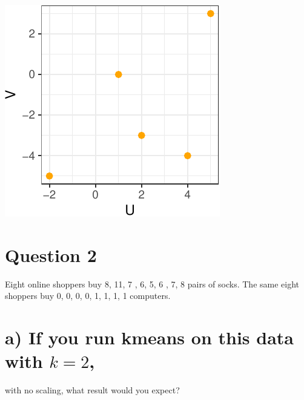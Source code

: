 \documentclass[]{article}
\begin{document}
\begin{center}\includegraphics{sol_A1_files/figure-latex/unnamed-chunk-2-3} \end{center}

\hypertarget{question-2}{%
\section{Question 2}\label{question-2}}

Eight online shoppers buy 8, 11, 7 , 6, 5, 6 , 7, 8 pairs of socks. The
same eight shoppers buy 0, 0, 0, 0, 1, 1, 1, 1 computers.

\hypertarget{a-if-you-run-kmeans-on-this-data-with-k-2}{%
\section{\texorpdfstring{a) If you run kmeans on this data with
\(k = 2\),}{a) If you run kmeans on this data with k = 2,}}\label{a-if-you-run-kmeans-on-this-data-with-k-2}}

with no scaling, what result would you expect?
\end{document}
